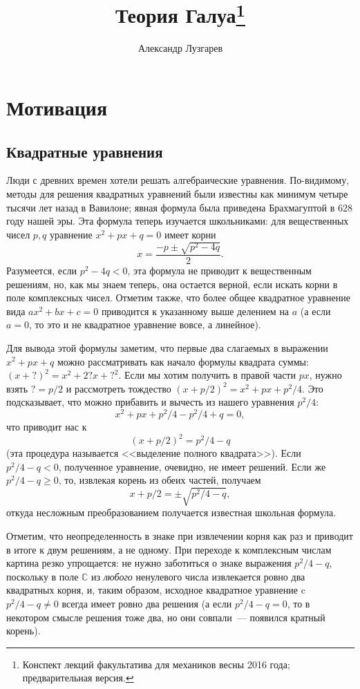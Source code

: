 \documentclass[a4paper,11pt]{scrartcl}
\theoremstyle{plain}
\theoremstyle{definition}
\newcommand\mb{\mathbb}
\begin{document}

\title{Теория Галуа\footnote{Конспект лекций факультатива для
механиков весны 2016 года; предварительная версия.}}
\author{Александр Лузгарев}
\maketitle

\tableofcontents

\section{Мотивация}

\subsection{Квадратные уравнения}

Люди с древних времен хотели решать алгебраические уравнения.
По-видимому, методы для решения квадратных уравнений были известны как
минимум четыре тысячи лет назад в Вавилоне; явная формула была
приведена Брахмагуптой в 628 году нашей эры.
Эта формула теперь изучается школьниками: для вещественных чисел
$p,q$ уравнение $x^2+px+q=0$ имеет корни
$$
x = \frac{-p\pm\sqrt{p^2-4q}}{2}.
$$
Разумеется, если $p^2-4q < 0$, эта формула не приводит к вещественным
решениям, но, как мы знаем теперь, она остается верной, если искать
корни в поле комплексных чисел.
Отметим также, что более общее квадратное уравнение вида
$ax^2 + bx + c = 0$ приводится к указанному выше делением на $a$
(а если $a=0$, то это и не квадратное уравнение вовсе, а линейное).

Для вывода этой формулы заметим, что первые два слагаемых в выражении
$x^2+px+q$ можно рассматривать как начало формулы квадрата суммы:
$(x+?)^2 = x^2 + 2?x + ?^2$. Если мы хотим получить в правой части
$px$, нужно взять $?=p/2$ и рассмотреть тождество
$(x+p/2)^2 = x^2 + px + p^2/4$.
Это подсказывает, что можно прибавить и вычесть из нашего уравнения
$p^2/4$:
$$
x^2 + px + p^2/4 - p^2/4 + q = 0,
$$
что приводит нас к
$$
(x+p/2)^2 = p^2/4 - q
$$
(эта процедура называется <<выделение полного квадрата>>).
Если $p^2/4-q<0$, полученное уравнение, очевидно, не имеет решений.
Если же $p^2/4-q\geq 0$, то,
извлекая корень из обеих частей, получаем
$$
x + p/2 = \pm\sqrt{p^2/4 -q},
$$
откуда несложным преобразованием получается известная школьная
формула.

Отметим, что неопределенность в знаке при извлечении корня как раз и
приводит в итоге к двум решениям, а не одному. При переходе к
комплексным числам картина резко упрощается: не нужно заботиться о
знаке выражения $p^2/4-q$, поскольку в поле $\mb C$ из {\em любого}
ненулевого числа извлекается ровно два квадратных корня, и, таким
образом, исходное квадратное уравнение c $p^2/4-q\neq 0$ всегда имеет
ровно два решения (а если $p^2/4-q=0$, то в некотором смысле решения
тоже два, но они совпали~--- появился кратный корень).
\end{document}
